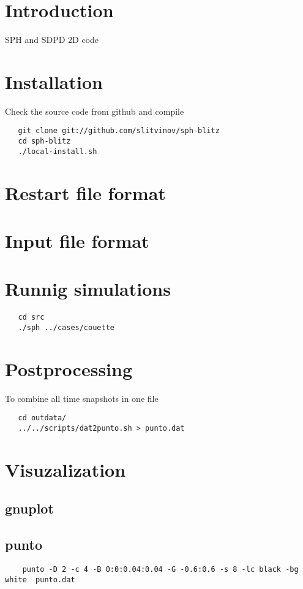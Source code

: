 \hypertarget{index_intro_sec}{}\section{Introduction}\label{index_intro_sec}
SPH and SDPD 2D code\hypertarget{index_install_sec}{}\section{Installation}\label{index_install_sec}
Check the source code from github and compile 

\begin{footnotesize}\begin{verbatim}
   git clone git://github.com/slitvinov/sph-blitz
   cd sph-blitz
   ./local-install.sh  \end{verbatim}
\end{footnotesize}
\hypertarget{index_restart_file}{}\section{Restart file format}\label{index_restart_file}
\hypertarget{index_input_file}{}\section{Input file format}\label{index_input_file}
\hypertarget{index_sim}{}\section{Runnig simulations}\label{index_sim}


\begin{footnotesize}\begin{verbatim}
   cd src
   ./sph ../cases/couette \end{verbatim}
\end{footnotesize}
 \hypertarget{index_post}{}\section{Postprocessing}\label{index_post}
To combine all time snapshots in one file 

\begin{footnotesize}\begin{verbatim}
   cd outdata/
   ../../scripts/dat2punto.sh > punto.dat
 \end{verbatim}
\end{footnotesize}
\hypertarget{index_vis}{}\section{Visuzalization}\label{index_vis}
\hypertarget{index_vis_gnuplot}{}\subsection{gnuplot}\label{index_vis_gnuplot}
 \hypertarget{index_vis_punto}{}\subsection{punto}\label{index_vis_punto}


\begin{footnotesize}\begin{verbatim}
    punto -D 2 -c 4 -B 0:0:0.04:0.04 -G -0.6:0.6 -s 8 -lc black -bg white  punto.dat \end{verbatim}
\end{footnotesize}
  